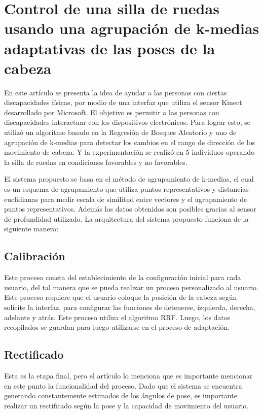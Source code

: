 \section*{Control de una silla de ruedas usando una agrupación de k-medias adaptativas de las poses de la cabeza}


En este artículo se presenta la idea de ayudar a las personas con ciertas discapacidades físicas, por modio de una interfaz que utiliza el sensor Kinect desarrollado por Microsoft. El objetivo es permitir a las personas con discapacidades interactuar con los dispositivos electrónicos. Para lograr esto, se utilizó un algoritmo basado en la Regresión de Bosques Aleatorio y uno de agrupación de k-medias para detectar los cambios en el rango de dirección de los movimiento de cabeza. Y la experimentación se realizó en 5 individuos operando la silla de ruedas en condiciones favorables y no favorables. \cite{LuisA2013}

El sistema propuesto se basa en el método de agrupamiento de k-medias, el cual es un esquema de agrupamiento que utiliza puntos representativos y distancias euclidianas para medir escala de similitud entre vectores y el agrupamiento de puntos representativos. Además los datos obtenidos son posibles gracias al sensor de profundidad utilizado. La arquitectura del sistema propuesto funciona de la siguiente manera: 

\subsection*{Calibración}

Este proceso consta del establecimiento de la configuración inicial para cada usuario, del tal manera que se pueda realizar un proceso personalizado al usuario. Este proceso requiere que el usuario coloque la posición de la cabeza según solicite la interfaz, para configurar las funciones de detenerse, izquierda, derecha, adelante y atrás. Este proceso utiliza el algoritmo RRF. Luego, los datos recopilados se guardan para luego utilizarse en el proceso de adaptación. \cite{LuisA2013} 

\subsection*{Rectificado}
Esta es la etapa final, pero el artículo lo menciona que es importante mencionar en este punto la funcionalidad del proceso. Dado que el sistema se encuentra generando constantemente estimados de los ángulos de pose, es importante realizar un rectificado según la pose y la capacidad de movimiento del usuario. \cite{LuisA2013} 


